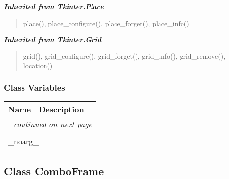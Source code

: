 \large{\textbf{\textit{Inherited from Tkinter.Place}}}

\begin{quote}
place(), place\_configure(), place\_forget(), place\_info()
\end{quote}

\large{\textbf{\textit{Inherited from Tkinter.Grid}}}

\begin{quote}
grid(), grid\_configure(), grid\_forget(), grid\_info(), grid\_remove(), location()
\end{quote}


  \subsubsection{Class Variables}

    \vspace{-1cm}
\hspace{\varindent}\begin{longtable}{|p{\varnamewidth}|p{\vardescrwidth}|l}
\cline{1-2}
\cline{1-2} \centering \textbf{Name} & \centering \textbf{Description}& \\
\cline{1-2}
\endhead\cline{1-2}\multicolumn{3}{r}{\small\textit{continued on next page}}\\\endfoot\cline{1-2}
\endlastfoot\multicolumn{2}{|l|}{\textit{Inherited from Tkinter.Misc}}\\
\multicolumn{2}{|p{\varwidth}|}{\raggedright \_noarg\_}\\
\cline{1-2}
\end{longtable}



\subsection{Class ComboFrame}

